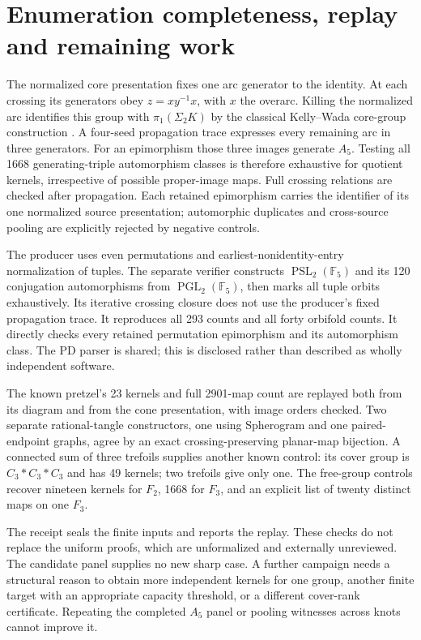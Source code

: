 \documentclass[11pt]{article}
\begin{document}
\section{Enumeration completeness, replay and remaining work}

The normalized core presentation fixes one arc generator to the
identity. At each crossing its generators obey
$z=x y^{-1}x$, with $x$ the overarc. Killing the normalized arc
identifies this group with $\pi_1(\Sigma_2K)$ by the classical
Kelly--Wada core-group construction \cite{core}. A four-seed
propagation trace expresses every remaining arc in three generators.
For an epimorphism those three images generate $A_5$. Testing all
1668 generating-triple automorphism classes is therefore exhaustive
for quotient kernels, irrespective of possible proper-image maps.
Full crossing relations are checked after propagation. Each retained
epimorphism carries the identifier of its one normalized source
presentation; automorphic duplicates and cross-source pooling are
explicitly rejected by negative controls.

The producer uses even permutations and earliest-nonidentity-entry
normalization of tuples. The separate verifier constructs
$\operatorname{PSL}_2(\mathbb F_5)$ and its 120 conjugation
automorphisms from $\operatorname{PGL}_2(\mathbb F_5)$, then marks
all tuple orbits exhaustively. Its iterative crossing closure does
not use the producer's fixed propagation trace. It reproduces all
293 counts and all forty orbifold counts. It directly checks every
retained permutation epimorphism and its automorphism class.
The PD parser is shared; this is disclosed rather than described as
wholly independent software.

The known pretzel's 23 kernels and full 2901-map count are replayed
both from its diagram and from the cone presentation, with image
orders checked. Two separate rational-tangle constructors, one using
Spherogram and one paired-endpoint graphs, agree by an exact
crossing-preserving planar-map bijection. A connected sum of three
trefoils supplies another known control: its cover group is
$C_3*C_3*C_3$ and has 49 kernels; two trefoils give only one. The
free-group controls recover nineteen kernels for $F_2$, 1668 for
$F_3$, and an explicit list of twenty distinct maps on one $F_3$.

\clearpage
The receipt  seals the finite inputs
and reports the replay. These checks do not replace the uniform
proofs, which are unformalized and externally unreviewed. The
candidate panel supplies no new sharp case. A further campaign needs
a structural reason to obtain more independent kernels for one
group, another finite target with an appropriate capacity threshold,
or a different cover-rank certificate. Repeating the completed
$A_5$ panel or pooling witnesses across knots cannot improve it.
\end{document}
